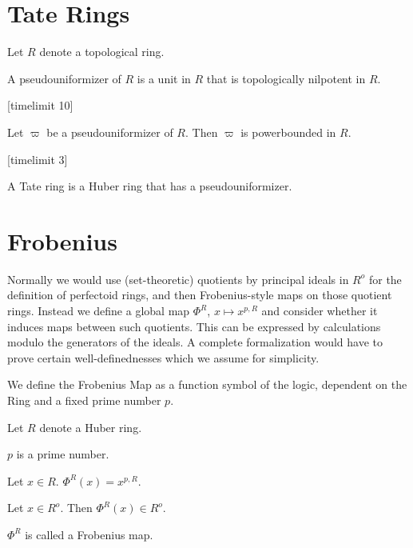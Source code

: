 \documentclass[11pt]{article}
\begin{document}
\section{Tate Rings}

\begin{forthel}

Let $R$ denote a topological ring.

\begin{definition}
A pseudouniformizer of $R$ is
a unit in $R$ that is topologically nilpotent in $R$.
\end{definition}


[timelimit 10]
\begin{lemma}
Let $\varpi$ be a pseudouniformizer of $R$.
Then $\varpi$ is powerbounded in $R$.
\end{lemma}
[timelimit 3]
\begin{definition}
A Tate ring is a Huber ring that has a pseudouniformizer.
\end{definition} 

\end{forthel} 
\section{Frobenius}
Normally we would use (set-theoretic) quotients by principal ideals in $R^o$
for the definition of perfectoid rings, and then Frobenius-style maps on
those quotient rings.
Instead we define a global map $\Phi^R$, $x \mapsto x^{p,R}$ and consider
whether it induces maps between such quotients. This
can be expressed by calculations modulo the generators of the ideals. 
A complete formalization would have to prove certain well-definednesses
which we assume for simplicity.

We define the Frobenius Map as a function symbol of the logic, dependent
on the Ring and a fixed prime number $p$.

\begin{forthel}
Let $R$ denote a Huber ring.

\begin{signature} $p$ is a prime number. 
\end{signature}

\begin{definition}
Let $x \in R$. $\Phi^{R} (x) = x^{p,R}$. 
\end{definition}

\begin{lemma}
Let $x \in R^o$. Then $\Phi^{R}(x) \in R^o$.
\end{lemma}

\end{forthel} $\Phi^{R}$ is called a Frobenius map. 
\end{document}
